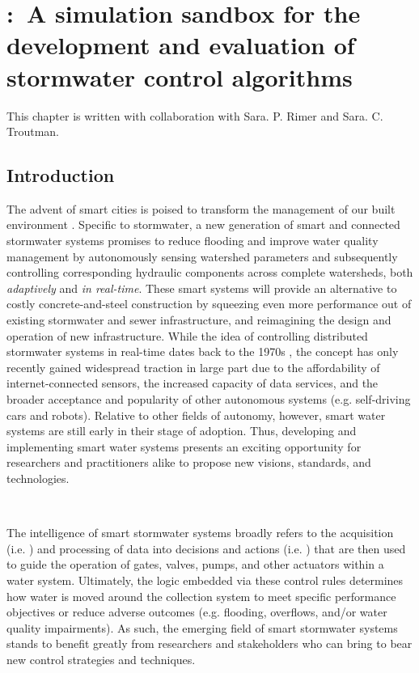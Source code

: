 \chapter{\pystormsNOSPACE:\ A simulation sandbox for the development and evaluation of stormwater control algorithms}\label{ch:pystorms}
This chapter is written with collaboration with Sara. P. Rimer and Sara. C. Troutman.

\vspace{1cm}

\section{Introduction}


The advent of smart cities is poised to transform the management of our built environment \citep{Chourabi2012, Harrison2011}. Specific to stormwater, a new generation of smart and connected stormwater systems promises to reduce flooding and improve water quality management by autonomously sensing watershed parameters and subsequently controlling corresponding hydraulic components across complete watersheds, both \emph{adaptively} and \emph{in real-time}. These smart systems will provide an alternative to costly concrete-and-steel construction by squeezing even more performance out of existing stormwater and sewer infrastructure, and reimagining the design and operation of new infrastructure. While the idea of controlling distributed stormwater systems in real-time dates back to the 1970s \citep{Trotta1977}, the concept has only recently gained widespread traction in large part due to the affordability of internet-connected sensors, the increased capacity of data services, and the broader acceptance and popularity of other autonomous systems (e.g. self-driving cars and robots). Relative to other fields of autonomy, however, smart water systems are still early in their stage of adoption. Thus, developing and implementing smart water systems presents an exciting opportunity for researchers and practitioners alike to propose new visions, standards, and technologies.

 \
 
The intelligence of smart stormwater systems broadly refers to the acquisition (i.e. ) and processing of data into decisions and actions (i.e. ) that are then used to guide the operation of gates, valves, pumps, and other actuators within a water system. Ultimately, the logic embedded via these control rules determines how water is moved around the collection system to meet specific performance objectives or reduce adverse outcomes (e.g. flooding, overflows, and/or water quality impairments). As such, the emerging field of smart stormwater systems stands to benefit greatly from researchers and stakeholders who can bring to bear new control strategies and techniques.

